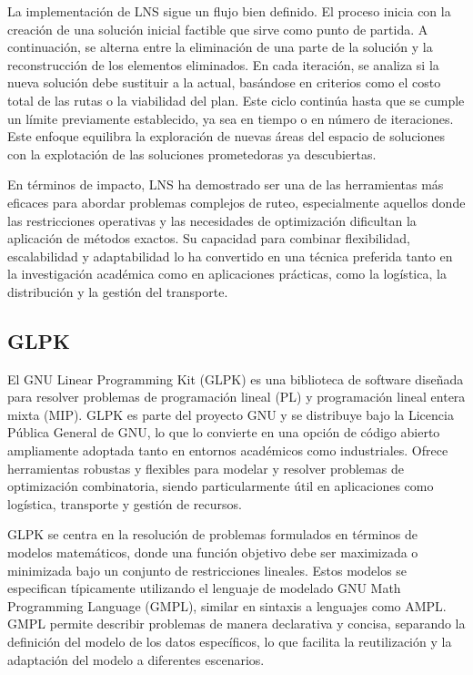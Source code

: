 \documentclass{article}
\begin{document}
La implementación de LNS sigue un flujo bien definido. El proceso inicia con la creación de una solución inicial factible que sirve como punto de partida. A continuación, se alterna entre la eliminación de una parte de la solución y la reconstrucción de los elementos eliminados. En cada iteración, se analiza si la nueva solución debe sustituir a la actual, basándose en criterios como el costo total de las rutas o la viabilidad del plan. Este ciclo continúa hasta que se cumple un límite previamente establecido, ya sea en tiempo o en número de iteraciones. Este enfoque equilibra la exploración de nuevas áreas del espacio de soluciones con la explotación de las soluciones prometedoras ya descubiertas.

En términos de impacto, LNS ha demostrado ser una de las herramientas más eficaces para abordar problemas complejos de ruteo, especialmente aquellos donde las restricciones operativas y las necesidades de optimización dificultan la aplicación de métodos exactos. Su capacidad para combinar flexibilidad, escalabilidad y adaptabilidad lo ha convertido en una técnica preferida tanto en la investigación académica como en aplicaciones prácticas, como la logística, la distribución y la gestión del transporte.

\subsection{GLPK}
El GNU Linear Programming Kit (GLPK) es una biblioteca de software diseñada para resolver problemas de programación lineal (PL) y programación lineal entera mixta (MIP). GLPK es parte del proyecto GNU y se distribuye bajo la Licencia Pública General de GNU, lo que lo convierte en una opción de código abierto ampliamente adoptada tanto en entornos académicos como industriales. Ofrece herramientas robustas y flexibles para modelar y resolver problemas de optimización combinatoria, siendo particularmente útil en aplicaciones como logística, transporte y gestión de recursos.

GLPK se centra en la resolución de problemas formulados en términos de modelos matemáticos, donde una función objetivo debe ser maximizada o minimizada bajo un conjunto de restricciones lineales. Estos modelos se especifican típicamente utilizando el lenguaje de modelado GNU Math Programming Language (GMPL), similar en sintaxis a lenguajes como AMPL. GMPL permite describir problemas de manera declarativa y concisa, separando la definición del modelo de los datos específicos, lo que facilita la reutilización y la adaptación del modelo a diferentes escenarios.
\end{document}
